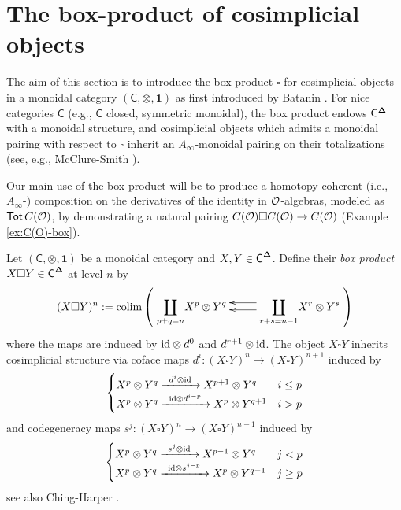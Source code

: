 \section{The box-product of cosimplicial objects}
The aim of this section is to introduce the box product $\square$ for cosimplicial objects in a monoidal category $(\mathsf{C}, \otimes, \mathbf{1})$ as first introduced by Batanin \cite{Bat-box}. For nice categories $\mathsf{C}$ (e.g.,  $\mathsf{C}$ closed, symmetric monoidal), the box product endows $\mathsf{C}^{\mathbf{\Delta}}$ with a monoidal structure, and cosimplicial objects which admits a monoidal pairing with respect to $\square$ inherit an $A_{\infty}$-monoidal pairing on their totalizations (see, e.g.,  McClure-Smith \cite[3.1]{MS-box}).

Our main use of the box product will be to produce a homotopy-coherent (i.e., $A_{\infty}$-) composition on the derivatives of the identity in $\mathcal{O}$-algebras, modeled as $\operatorname{\mathsf{Tot}} C(\mathcal{O})$, by demonstrating a natural pairing $C(\mathcal{O})\square C(\mathcal{O})\to C(\mathcal{O})$ (Example \ref{ex:C(O)-box}).

\begin{definition} \label{def:box-product} 
Let $(\mathsf{C}, \otimes, \mathbf{1})$ be a monoidal category and $X,Y\in \textsf{C}^{\mathbf{\Delta}}$. Define their \textit{box product} $X\square Y\in \textsf{C}^{\mathbf{\Delta}}$ at level $n$ by \[
(X\square Y)^n:=
\colim \left( \xymatrix{ 
    \displaystyle{\coprod_{p+q=n}} X^{p}\otimes Y^{q} & 
    \ar@<-1 ex>[l] \ar@<.5 ex>[l] 
    \displaystyle{\coprod_{r+s=n-1}} X^{r}\otimes Y^{s} 
}\right) \]
where the maps are induced by $\mathrm{id}\otimes d^0$ and $d^{r+1}\otimes \mathrm{id}$. The object $X\square Y$ inherits cosimplicial structure via coface maps $d^i\colon (X\square Y)^{n}\to (X\square Y)^{n+1}$ induced by
\[\begin{cases} 
X^p\otimes Y^q \xrightarrow{\;\; d^i\otimes \mathrm{id}\;\;} X^{p+1}\otimes Y^{q} & i \leq p
\\
X^p\otimes Y^q \xrightarrow{\;\; \mathrm{id} \otimes d^{i-p} \;\;} X^{p}\otimes Y^{q+1} & i > p
\end{cases}
\]
and codegeneracy maps $s^j\colon (X\square Y)^n \to (X\square Y)^{n-1}$ induced by
\[\begin{cases} 
X^p\otimes Y^q \xrightarrow{\;\; s^j\otimes \mathrm{id}\;\;} X^{p-1}\otimes Y^{q} & j < p
\\
X^p\otimes Y^q \xrightarrow{\;\; \mathrm{id} \otimes s^{j-p} \;\;} X^{p}\otimes Y^{q-1} & j \geq p
\end{cases}
\]
see also Ching-Harper \cite[]{Ching-Harper-Koszul}.
\end{definition}

